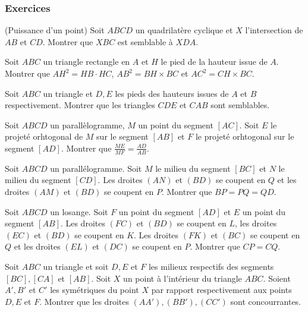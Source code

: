 
\subsubsection{Exercices}


\begin{exo}
(Puissance d'un point)
Soit $ABCD$ un quadrilatère cyclique et $X$ l’intersection de $AB$ et $CD$. Montrer que $XBC$ est semblable à $XDA$.
\end{exo}

\begin{exo}
Soit $ABC$ un triangle rectangle en $A$ et $H$ le pied de la hauteur issue de $A$. Montrer que $AH^2 = HB \cdot HC$, $AB^2=BH\times BC$ et $AC^2=CH\times BC$. 
\end{exo}

\begin{exo}
Soit $ABC$ un triangle et $D,E$ les pieds des hauteurs issues de $A$ et $B$ respectivement. Montrer que les triangles $CDE$ et $CAB$ sont semblables.
\end{exo}

\begin{exo}
Soit $ABCD$ un parallèlogramme, $M$ un point du segment $[AC]$. Soit $E$ le projeté orhtogonal de $M$ sur le segment $[AB]$ et $F$ le projeté orhtogonal sur le segment $[AD]$. Montrer que $\frac{ME}{MF}=\frac{AD}{AB}$. 
\end{exo}

\begin{exo}
Soit $ABCD$ un parallélogramme. Soit $M$ le milieu du segment $[BC]$ et $N$ le milieu du segment $[CD]$. Les droites $(AN)$ et $(BD)$ se coupent en $Q$ et les droites $(AM)$ et $(BD)$ se coupent en $P$. Montrer que $BP=PQ=QD$.
\end{exo}

\begin{exo}
Soit $ABCD$ un losange. Soit $F$ un point du segment $[AD]$ et $E$ un point du segment $[AB]$. Les droites $(FC)$ et $(BD)$ se coupent en $L$, les droites $(EC)$ et $(BD)$ se coupent en $K$. Les droites $(FK)$ et $(BC)$ se coupent en $Q$ et les droites $(EL)$ et $(DC)$ se coupent en $P$. Montrer que $CP=CQ$. 
\end{exo}

\begin{exo}
Soit $ABC$ un triangle et soit $D,E$ et $F$ les milieux respectifs des segments $[BC], [CA]$ et $[AB]$. Soit $X$ un point à l'intérieur du triangle $ABC$. Soient $A',B'$ et $C'$ les symétriques du point $X$ par rapport respectivement aux points $D,E$ et $F$. Montrer que les droites $(AA'),(BB'),(CC')$ sont concourrantes. 
\end{exo}

